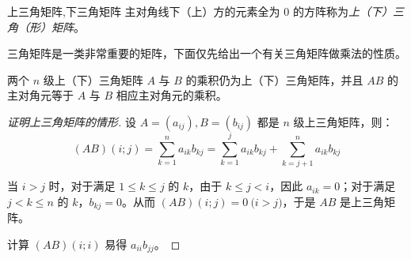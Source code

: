 \begin{definition}{上三角矩阵,下三角矩阵}
	主对角线下（上）方的元素全为 $0$ 的方阵称为\emph{上（下）三角（形）矩阵}。
\end{definition}

三角矩阵是一类非常重要的矩阵，下面仅先给出一个有关三角矩阵做乘法的性质。

\begin{theorem}
	两个 $n$ 级上（下）三角矩阵 $A$ 与 $B$ 的乘积仍为上（下）三角矩阵，并且 $AB$ 的主对角元等于 $A$ 与 $B$ 相应主对角元的乘积。
\end{theorem}

\begin{proof}[证明上三角矩阵的情形]
	设 $A = (a_{ij}), B = (b_{ij})$ 都是 $n$ 级上三角矩阵，则：
	$$
	(AB)(i; j) = \sum\limits_{k = 1}^n a_{ik} b_{kj} = \sum\limits_{k = 1}^j a_{ik}b_{kj} + \sum\limits_{k = j + 1}^n a_{ik} b_{kj}
	$$

	当 $i > j$ 时，对于满足 $1 \le k \le j$ 的 $k$，由于 $k \le j < i$，因此 $a_{ik} = 0$；对于满足 $j < k \le n$ 的 $k$，$b_{kj} = 0$。从而 $(AB)(i; j) = 0 \pod{i > j}$，于是 $AB$ 是上三角矩阵。

	计算 $(AB)(i; i)$ 易得 $a_{ii} b_{jj}$。
\end{proof}

